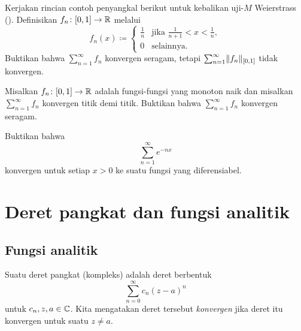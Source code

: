 \begin{exercise}
Kerjakan rincian contoh penyangkal berikut untuk kebalikan
uji-$M$ Weierstrass ().  Definisikan
$f_n \colon [0,1] \to {\mathbb{R}}$ melalui
\begin{equation*}
f_n(x) \coloneqq
\begin{cases}
\frac{1}{n} & \text{jika } \frac{1}{n+1} < x < \frac{1}{n},\\
0	    & \text{selainnya.}
\end{cases}
\end{equation*}
Buktikan bahwa $\sum_{n=1}^\infty f_n$ konvergen seragam, tetapi
$\sum_{n=1}^\infty \lVert {f_n} \rVert_{[0,1]}$
tidak konvergen.
\end{exercise}

\begin{exercise}
Misalkan $f_n \colon [0,1] \to {\mathbb{R}}$ adalah fungsi-fungsi yang monoton naik dan
misalkan $\sum_{n=1}^\infty f_n$ konvergen titik demi titik.  Buktikan bahwa
$\sum_{n=1}^\infty f_n$
konvergen seragam.
\end{exercise}

\begin{exercise}
Buktikan bahwa
\begin{equation*}
\sum_{n=1}^\infty e^{-nx}
\end{equation*}
konvergen untuk setiap $x > 0$ ke suatu fungsi yang diferensiabel.
\end{exercise}


\sectionnewpage
\section{Deret pangkat dan fungsi analitik}
\label{sec:analfuncs}



\subsection{Fungsi analitik}

Suatu deret pangkat (kompleks) adalah deret berbentuk
\begin{equation*}
\sum_{n=0}^\infty c_n {(z-a)}^n
\end{equation*}
untuk $c_n, z, a \in {\mathbb{C}}$.  Kita mengatakan deret tersebut
\emph{konvergen} jika deret itu konvergen untuk
suatu $z \neq a$.


